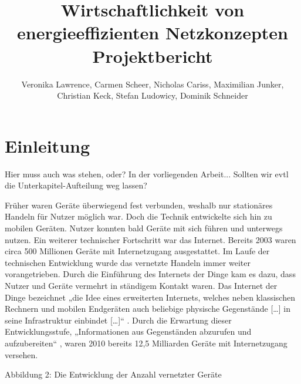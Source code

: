 \documentclass[12pt,titlepage]{article}
\newcommand{\firstpages}{

     \newpage
     \tableofcontents{}
     \addtocontents{toc}{~\hfill\textbf{Seite}\par}

     \newpage
     \listoffigures

     \newpage
     \listoftables
     \newpage
}
\begin{document}
\title{\huge{Wirtschaftlichkeit von energieeffizienten Netzkonzepten} \\ \large{Projektbericht}} 
\author{Veronika Lawrence, Carmen Scheer, Nicholas Cariss, Maximilian Junker,\\ Christian Keck, Stefan Ludowicy, Dominik Schneider} 
\maketitle
\firstpages

\section{Einleitung}
Hier muss auch was stehen, oder? 
In der vorliegenden Arbeit...
Sollten wir evtl die Unterkapitel-Aufteilung weg lassen?

Früher waren Geräte überwiegend fest verbunden, weshalb nur stationäres Handeln für Nutzer möglich war. Doch die Technik entwickelte sich hin zu mobilen Geräten. Nutzer konnten bald Geräte mit sich führen und unterwegs nutzen. Ein weiterer technischer Fortschritt war das Internet. Bereits 2003 waren circa 500 Millionen Geräte  mit Internetzugang ausgestattet. 
Im Laufe der technischen Entwicklung wurde das vernetzte Handeln immer weiter vorangetrieben. Durch die Einführung des Internets der Dinge kam es dazu, dass Nutzer und Geräte vermehrt in ständigem Kontakt waren. Das Internet der Dinge bezeichnet „die Idee eines erweiterten Internets, welches neben klassischen Rechnern und mobilen Endgeräten auch beliebige physische Gegenstände […] in seine Infrastruktur einbindet […]“ . Durch die Erwartung dieser Entwicklungsstufe, „Informationen aus Gegenständen abzurufen und aufzubereiten“ , waren 2010 bereits 12,5 Milliarden Geräte  mit Internetzugang versehen. 

Abbildung 2: Die Entwicklung der Anzahl vernetzter Geräte 
\end{document}
